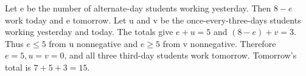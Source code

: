 Let e be the number of alternate-day students working yesterday. Then $8-e$ work today and e tomorrow. Let u and v be the once-every-three-days students working yesterday and today. The totals give $e+u=5$ and $(8-e)+v=3$. Thus $e\le5$ from u nonnegative and $e\ge5$ from v nonnegative. Therefore $e=5,u=v=0$, and all three third-day students work tomorrow. Tomorrow's total is $7+5+3=\boxed{15}$.
